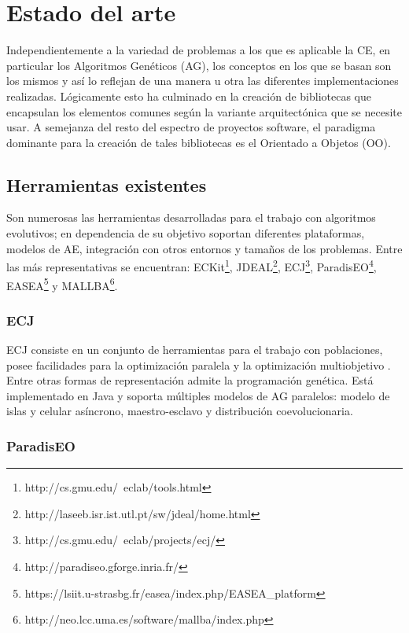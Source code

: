 \documentclass[runningheads]{llncs}
\begin{document}


\section{Estado del arte}
\label{sec:fprog2ae}

Independientemente a la variedad de problemas a los que es aplicable la CE, en particular los Algoritmos Genéticos (AG), los conceptos en los que se basan son los mismos y así lo reflejan de una manera u otra las diferentes implementaciones realizadas. Lógicamente esto ha culminado en la creación de bibliotecas que encapsulan los elementos comunes según la variante arquitectónica que se necesite usar. A semejanza del resto del espectro de proyectos software, el paradigma dominante para la creación de tales bibliotecas es el Orientado a Objetos (OO).

\subsection{Herramientas existentes}

Son numerosas las herramientas desarrolladas para el trabajo con algoritmos evolutivos; en dependencia de su objetivo soportan diferentes plataformas, modelos de AE, integración con otros entornos y tamaños de los problemas. Entre las más representativas se encuentran: ECKit\footnote{http://cs.gmu.edu/~eclab/tools.html}, JDEAL\footnote{http://laseeb.isr.ist.utl.pt/sw/jdeal/home.html}, ECJ\footnote{http://cs.gmu.edu/~eclab/projects/ecj/}, ParadisEO\footnote{http://paradiseo.gforge.inria.fr/}, EASEA\footnote{https://lsiit.u-strasbg.fr/easea/index.php/EASEA\_platform} y MALLBA\footnote{http://neo.lcc.uma.es/software/mallba/index.php}.


\subsubsection{ECJ}

ECJ consiste en un conjunto de herramientas para el trabajo con poblaciones, posee facilidades para la optimización paralela y la optimización multiobjetivo \cite{Luke2010}. Entre otras formas de representación admite la programación genética. Está implementado en Java y soporta múltiples modelos de AG paralelos: modelo de islas y celular asíncrono, maestro-esclavo y distribución coevolucionaria.

\subsubsection{ParadisEO}
\end{document}
